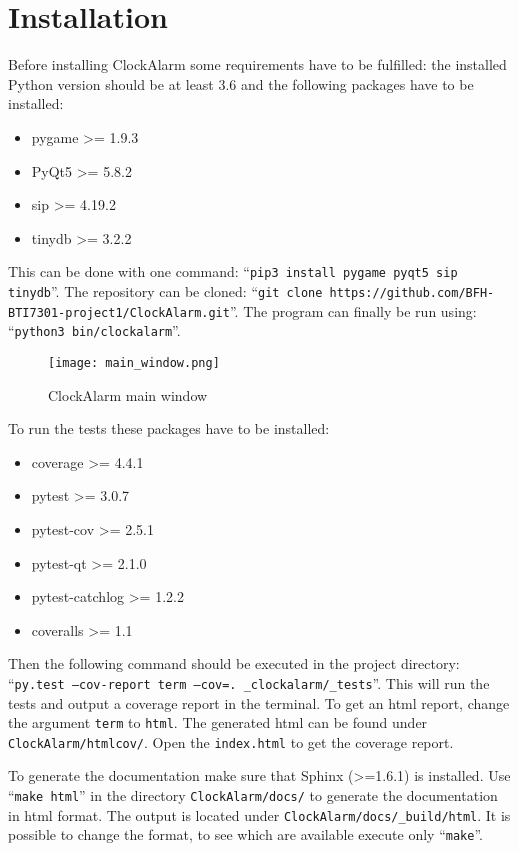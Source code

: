 \chapter{Installation}

Before installing ClockAlarm some requirements have to be fulfilled: the
installed Python version should be at least 3.6 and the following packages have
to be installed:

\begin{itemize}
    \item pygame >= 1.9.3
    \item PyQt5 >= 5.8.2 
    \item sip >= 4.19.2
    \item tinydb >= 3.2.2 
\end{itemize}

This can be done with one command: ``\texttt{pip3 install pygame pyqt5 sip
tinydb}''.
The repository can be cloned: ``\texttt{git clone
https://github.com/BFH-BTI7301-project1/ClockAlarm.git}''.
The program can finally be run using: ``\texttt{python3 bin/clockalarm}''.

\begin{figure}[h]
    \centering
    \caption{ClockAlarm main window}
    \texttt{[image: main\_window.png]}
\end{figure}

To run the tests these packages have to be installed:

\begin{itemize}
    \item coverage >= 4.4.1
    \item pytest >= 3.0.7
    \item pytest-cov >= 2.5.1
    \item pytest-qt >= 2.1.0
    \item pytest-catchlog >= 1.2.2
    \item coveralls >= 1.1
\end{itemize}

Then the following command should be executed in the project directory:
``\texttt{py.test --cov-report term --cov=. \_clockalarm/\_tests}''. This will
run the tests and output a coverage report in the terminal. To get an html
report, change the argument \texttt{term} to \texttt{html}. The generated html
can be found under \texttt{ClockAlarm/htmlcov/}. Open the \texttt{index.html} to
get the coverage report.

To generate the documentation make sure that Sphinx (>=1.6.1) is installed. Use
``\texttt{make html}'' in the directory \texttt{ClockAlarm/docs/} to generate the
documentation in html format. The output is located under
\texttt{ClockAlarm/docs/\_build/html}. It is possible to change the format, to
see which are available execute only ``\texttt{make}''.
